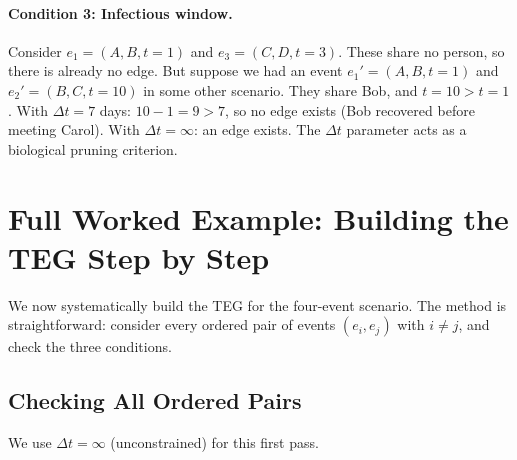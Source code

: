 \paragraph{Condition 3: Infectious window.}
Consider $e_1=(A,B,t=1)$ and $e_3=(C,D,t=3)$. These share no person, so there
is already no edge. But suppose we had an event $e_1'=(A,B,t=1)$ and
$e_2'=(B,C,t=10)$ in some other scenario. They share Bob, and $t=10 > t=1$.
With $\Delta t = 7$ days: $10 - 1 = 9 > 7$, so no edge exists (Bob recovered
before meeting Carol). With $\Delta t = \infty$: an edge exists. The $\Delta t$
parameter acts as a biological pruning criterion.

\section{Full Worked Example: Building the TEG Step by Step}
\label{sec:teg_worked}

We now systematically build the TEG for the four-event scenario. The method is
straightforward: consider every ordered pair of events $(e_i, e_j)$ with
$i \neq j$, and check the three conditions.

\subsection{Checking All Ordered Pairs}

We use $\Delta t = \infty$ (unconstrained) for this first pass.

